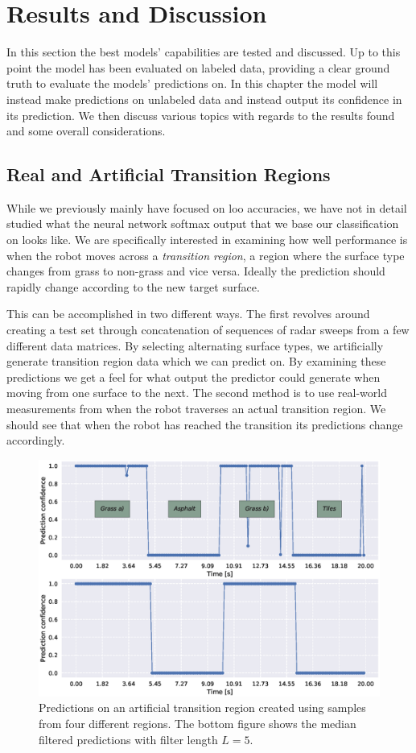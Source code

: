\chapter{Results and Discussion}
In this section the best models' capabilities are tested and discussed. Up to this point the model has been evaluated on labeled data, providing a clear ground truth to evaluate the models' predictions on. In this chapter the model will instead make predictions on unlabeled data and instead output its confidence in its prediction. We then discuss various topics with regards to the results found and some overall considerations.

\section{Real and Artificial Transition Regions}

While we previously mainly have focused on \gls{loo} accuracies, we have not in detail studied what the neural network softmax output that we base our classification on looks like. We are specifically interested in examining how well performance is when the robot moves across a \emph{transition region}, a region where the surface type changes from grass to non-grass and vice versa. Ideally the prediction should rapidly change according to the new target surface. 

This can be accomplished in two different ways. The first revolves around creating a test set through concatenation of sequences of radar sweeps from a few different data matrices. By selecting alternating surface types, we artificially generate transition region data which we can predict on. By examining these predictions we get a feel for what output the predictor could generate when moving from one surface to the next. The second method is to use real-world measurements from when the robot traverses an actual transition region. We should see that when the robot has reached the transition its predictions change accordingly. 

\begin{figure}[t]
	\centering
	\includegraphics[scale=0.5]{figs_temp/varmats1}
	\caption{Predictions on an artificial transition region created using samples from four different regions. The bottom figure shows the median filtered predictions with filter length $L=5$.}
	\label{fig:artificial1}
\end{figure}

